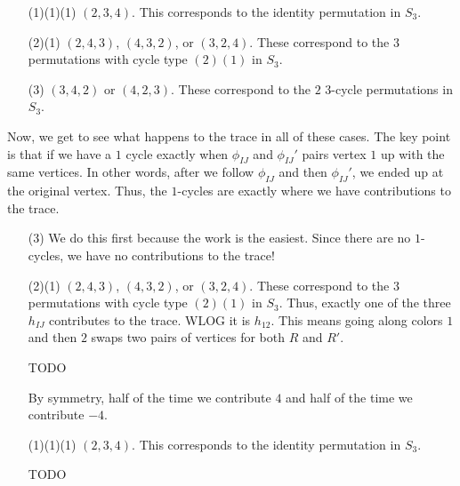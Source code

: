 \documentclass[12pt,twoside,singlespace]{amsart}
\numberwithin{equation}{section}
\theoremstyle{definition}
\begin{document}
\begin{itemize}
\item[(1)(1)(1)] $(2,3,4)$. This corresponds to the identity permutation in $S_3$.
\item[(2)(1)] $(2,4,3)$, $(4,3,2)$, or $(3,2,4)$. These correspond to the $3$ permutations with cycle type $(2)(1)$ in $S_3$.
\item[(3)] $(3,4,2)$ or $(4,2,3)$. These correspond to the $2$ $3$-cycle permutations in $S_3$.
\end{itemize}

Now, we get to see what happens to the trace in all of these cases. The key point is that if we have a $1$ cycle exactly when $\phi_{IJ}$ and $\phi_{IJ}'$ pairs vertex $1$ up with the same vertices. In other words, after we follow $\phi_{IJ}$ and then $\phi_{IJ}'$, we ended up at the original vertex. Thus, the $1$-cycles are exactly where we have contributions to the trace.

\begin{itemize}
\item[(3)] We do this first because the work is the easiest. Since there are no $1$-cycles, we have no contributions to the trace!
\item[(2)(1)] $(2,4,3)$, $(4,3,2)$, or $(3,2,4)$. These correspond to the $3$ permutations with cycle type $(2)(1)$ in $S_3$. Thus, exactly one of the three $h_{IJ}$ contributes to the trace. WLOG it is $h_{12}$. This means going along colors $1$ and then $2$ swaps two pairs of vertices for both $R$ and $R'$. 

TODO

By symmetry, half of the time we contribute $4$ and half of the time we contribute $-4$.
\item[(1)(1)(1)] $(2,3,4)$. This corresponds to the identity permutation in $S_3$.

TODO

\end{itemize}





%
% 
\end{document}
